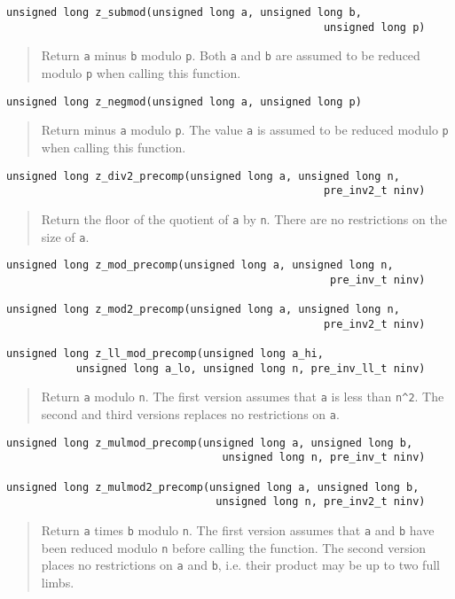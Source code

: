 \documentclass[a4paper,10pt]{article}
\newcommand{\code}{\lstinline}
\begin{document}
\begin{lstlisting}
unsigned long z_submod(unsigned long a, unsigned long b, 
                                                  unsigned long p)
\end{lstlisting}
\begin{quote}
Return \code{a} minus \code{b} modulo \code{p}. Both \code{a} and \code{b} are assumed to be reduced modulo \code{p} when calling this function. 
\end{quote}

\begin{lstlisting}
unsigned long z_negmod(unsigned long a, unsigned long p)
\end{lstlisting}
\begin{quote}
Return minus \code{a} modulo \code{p}. The value \code{a} is assumed to be reduced modulo \code{p} when calling this function. 
\end{quote}

\begin{lstlisting}
unsigned long z_div2_precomp(unsigned long a, unsigned long n, 
                                                  pre_inv2_t ninv)
\end{lstlisting}
\begin{quote}
Return the floor of the quotient of \code{a} by \code{n}. There are no restrictions on the size of \code{a}.
\end{quote}

\begin{lstlisting}
unsigned long z_mod_precomp(unsigned long a, unsigned long n, 
                                                   pre_inv_t ninv)

unsigned long z_mod2_precomp(unsigned long a, unsigned long n, 
                                                  pre_inv2_t ninv)

unsigned long z_ll_mod_precomp(unsigned long a_hi,
           unsigned long a_lo, unsigned long n, pre_inv_ll_t ninv)
\end{lstlisting}
\begin{quote}
Return \code{a} modulo \code{n}. The first version assumes that \code{a} is less than \code{n^2}. The second and third versions replaces no restrictions on \code{a}.
\end{quote}

\begin{lstlisting}
unsigned long z_mulmod_precomp(unsigned long a, unsigned long b, 
                                  unsigned long n, pre_inv_t ninv)
                                         
unsigned long z_mulmod2_precomp(unsigned long a, unsigned long b, 
                                 unsigned long n, pre_inv2_t ninv)
\end{lstlisting}
\begin{quote}
Return \code{a} times \code{b} modulo \code{n}. The first version assumes that \code{a} and \code{b} have been reduced modulo \code{n} before calling the function. The second version places no restrictions on \code{a} and \code{b}, i.e. their product may be up to two full limbs.
\end{quote}
                                         
\end{document}
